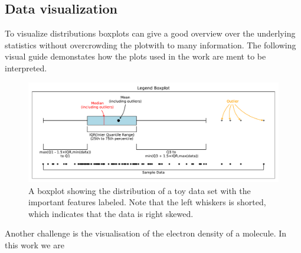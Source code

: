 \subsection{Data visualization}\label{boxplots}
To visualize distributions boxplots can give a good overview over the underlying statistics without overcrowding the plotwith to many information. The following visual guide demonstates how the plots used in the work are ment to be interpreted.
\begin{figure}[H]
    \centering
    \includegraphics[width=1.\textwidth]{chapters/foundations/images_foundation/legend_boxplot}
    \caption{A boxplot showing the distribution of a toy data set with the important features labeled. Note that the left whiskers is shorted, which indicates that the data is right skewed.}
\end{figure}
Another challenge is the visualisation of the electron density of a molecule. In this work we are